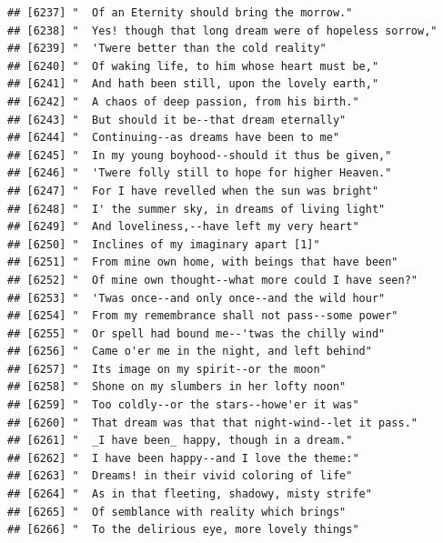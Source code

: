 \documentclass{article}\usepackage[]{graphicx}\usepackage[]{color}
\makeatletter
\newenvironment{kframe}{%
 \def\at@end@of@kframe{}%
 \ifinner\ifhmode%
  \def\at@end@of@kframe{\end{minipage}}%
  \begin{minipage}{\columnwidth}%
 \fi\fi%
 \def\FrameCommand##1{\hskip\@totalleftmargin \hskip-\fboxsep
 \colorbox{shadecolor}{##1}\hskip-\fboxsep
     \hskip-\linewidth \hskip-\@totalleftmargin \hskip\columnwidth}%
 \MakeFramed {\advance\hsize-\width
   \@totalleftmargin\z@ \linewidth\hsize
   \@setminipage}}%
 {\par\unskip\endMakeFramed%
 \at@end@of@kframe}
\newenvironment{knitrout}{}{} %
\makeatother
\begin{document}
\begin{knitrout}
\begin{kframe}
\begin{verbatim}
## [6237] "  Of an Eternity should bring the morrow."                                   
## [6238] "  Yes! though that long dream were of hopeless sorrow,"                      
## [6239] "  'Twere better than the cold reality"                                       
## [6240] "  Of waking life, to him whose heart must be,"                               
## [6241] "  And hath been still, upon the lovely earth,"                               
## [6242] "  A chaos of deep passion, from his birth."                                  
## [6243] "  But should it be--that dream eternally"                                    
## [6244] "  Continuing--as dreams have been to me"                                     
## [6245] "  In my young boyhood--should it thus be given,"                             
## [6246] "  'Twere folly still to hope for higher Heaven."                             
## [6247] "  For I have revelled when the sun was bright"                               
## [6248] "  I' the summer sky, in dreams of living light"                              
## [6249] "  And loveliness,--have left my very heart"                                  
## [6250] "  Inclines of my imaginary apart [1]"                                        
## [6251] "  From mine own home, with beings that have been"                            
## [6252] "  Of mine own thought--what more could I have seen?"                         
## [6253] "  'Twas once--and only once--and the wild hour"                              
## [6254] "  From my remembrance shall not pass--some power"                            
## [6255] "  Or spell had bound me--'twas the chilly wind"                              
## [6256] "  Came o'er me in the night, and left behind"                                
## [6257] "  Its image on my spirit--or the moon"                                       
## [6258] "  Shone on my slumbers in her lofty noon"                                    
## [6259] "  Too coldly--or the stars--howe'er it was"                                  
## [6260] "  That dream was that that night-wind--let it pass."                         
## [6261] "  _I have been_ happy, though in a dream."                                   
## [6262] "  I have been happy--and I love the theme:"                                  
## [6263] "  Dreams! in their vivid coloring of life"                                   
## [6264] "  As in that fleeting, shadowy, misty strife"                                
## [6265] "  Of semblance with reality which brings"                                    
## [6266] "  To the delirious eye, more lovely things"                                  

\end{verbatim}
\end{kframe}
\end{knitrout}
\end{document}
